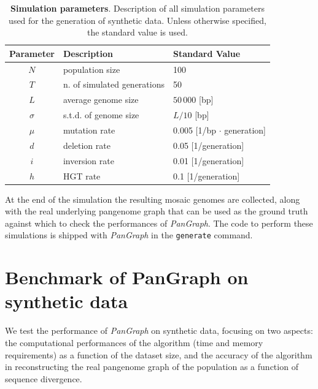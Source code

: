 \documentclass[aps,rmp,reprint,superscriptaddress,notitlepage,10pt,onecolumn]{revtex4-1}
\begin{document}
\begin{table}[hb]
    \begin{tabular}{c l l}
        \hline\hline
        Parameter & Description                 & Standard Value                  \\
        \hline
        $N$       & population size             & 100                             \\
        $T$       & n. of simulated generations & 50                              \\
        $L$       & average genome size         & $50\, 000$ [bp]                 \\
        $\sigma$  & s.t.d. of genome size       & $L/10$ [bp]                     \\
        $\mu$     & mutation rate               & 0.005 [1/bp $\cdot$ generation] \\
        $d$       & deletion rate               & 0.05 [1/generation]             \\
        $i$       & inversion rate              & 0.01 [1/generation]             \\
        $h$       & HGT rate                    & 0.1 [1/generation]              \\
        \hline
    \end{tabular}
    \caption{{\bf Simulation parameters}. Description of all simulation parameters used for the generation of synthetic data. Unless otherwise specified, the standard value is used.}
    \label{table:sim-params}
\end{table}

At the end of the simulation the resulting mosaic genomes are collected, along with the real underlying pangenome graph that can be used as the ground truth against which to check the performances of \textit{PanGraph}. The code to perform these simulations is shipped with \textit{PanGraph} in the \verb|generate| command.

\section{Benchmark of PanGraph on synthetic data}

We test the performance of \textit{PanGraph} on synthetic data, focusing on two aspects: the computational performances of the algorithm (time and memory requirements) as a function of the dataset size, and the accuracy of the algorithm in reconstructing the real pangenome graph of the population as a function of sequence divergence.
\end{document}
